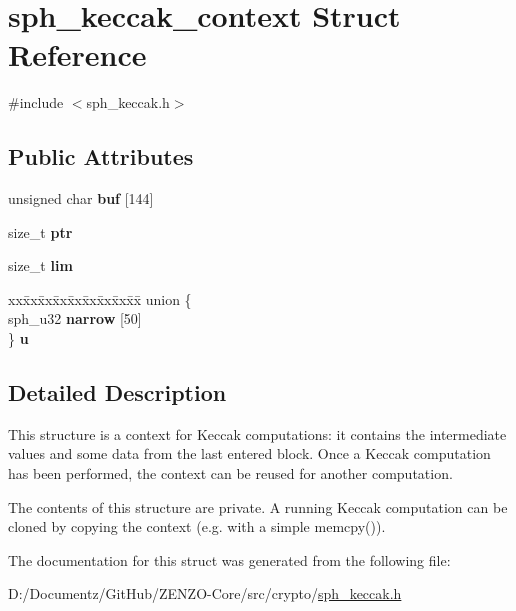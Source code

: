 \hypertarget{structsph__keccak__context}{}\section{sph\+\_\+keccak\+\_\+context Struct Reference}
\label{structsph__keccak__context}


{\ttfamily \#include $<$sph\+\_\+keccak.\+h$>$}

\subsection*{Public Attributes}
\begin{DoxyCompactItemize}
\item 
\mbox{\label{structsph__keccak__context_a05befb157f151a3801b923e6fa910b9e}} 
unsigned char {\bfseries buf} \mbox{[}144\mbox{]}
\item 
\mbox{\label{structsph__keccak__context_a3f5799de9b58573925c8657ce5373f9c}} 
size\+\_\+t {\bfseries ptr}
\item 
\mbox{\label{structsph__keccak__context_a79b7eb8376dd39e5a0d0964dc7b78838}} 
size\+\_\+t {\bfseries lim}
\item 
\mbox{\label{structsph__keccak__context_ac81977e503fcf3a5432cea5bfc68ee6e}} 
\begin{tabbing}
xx\=xx\=xx\=xx\=xx\=xx\=xx\=xx\=xx\=\kill
union \{\\
\>sph\_u32 {\bfseries narrow} \mbox{[}50\mbox{]}\\
\} {\bfseries u}\\

\end{tabbing}\end{DoxyCompactItemize}


\subsection{Detailed Description}
This structure is a context for Keccak computations\+: it contains the intermediate values and some data from the last entered block. Once a Keccak computation has been performed, the context can be reused for another computation.

The contents of this structure are private. A running Keccak computation can be cloned by copying the context (e.\+g. with a simple {\ttfamily memcpy()}). 

The documentation for this struct was generated from the following file\+:\begin{DoxyCompactItemize}
\item 
D\+:/\+Documentz/\+Git\+Hub/\+Z\+E\+N\+Z\+O-\/\+Core/src/crypto/\mbox{\hyperlink{sph__keccak_8h}{sph\+\_\+keccak.\+h}}\end{DoxyCompactItemize}

